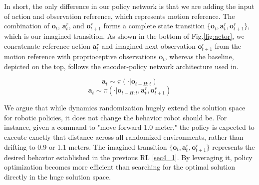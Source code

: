 In short, the only difference in our policy network is that we are adding the input of action and observation reference, which represents motion reference.
The combination of $\mathbf{o}_{t}$, $\mathbf{a}^{r}_{t}$, and $\mathbf{o}^{r}_{t+1}$ forms a complete state transition $\{\mathbf{o}_{t}, \mathbf{a}^{r}_{t}, \mathbf{o}^{r}_{t+1}\}$, which is our imagined transition.
As shown in the bottom of Fig.\ref{fig:actor}, we concatenate reference action $\mathbf{a}^{r}_{t}$ and imagined next observation $\mathbf{o}^{r}_{t+1}$ from the motion reference with proprioceptive observations $\mathbf{o}_{t}$, whereas the baseline, depicted on the top, follows the encoder-policy network architecture used in\cite{nahrendra2023dreamwaq, long2024him}.

\begin{equation}
    \mathbf{a}_t \sim \pi(\cdot | \mathbf{o}_{t-H:t})
\end{equation}
\begin{equation}
    \mathbf{a}_t \sim \pi(\cdot | \mathbf{o}_{t-H:t}, \mathbf{a}^{r}_{t}, \mathbf{o}^{r}_{t+1})
\end{equation}


We argue that while dynamics randomization hugely extend the solution space for robotic policies, it does not change the behavior robot should be. 
For instance, given a command to "move forward 1.0 meter," the policy is expected to execute exactly that distance across all randomized environments, rather than drifting to 0.9 or 1.1 meters.
The imagined transition $\{\mathbf{o}_{t}, \mathbf{a}^{r}_{t}, \mathbf{o}^{r}_{t+1}\}$ represents the desired behavior established in the previous RL \ref{sec4_1}. By leveraging it, policy optimization becomes more efficient than searching for the optimal solution directly in the huge solution space.